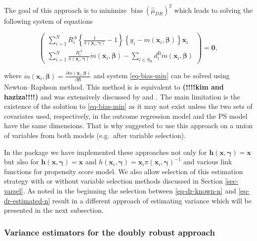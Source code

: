 \documentclass[
]{jss}
\begin{document}
The goal of this approach is to minimize
\(\operatorname{bias}\left(\hat{\mu}_{D R}\right)^2\) which leads to
solving the following system of equations

\begin{equation}
\left(\begin{array}{c}
\sum_{i=1}^N R_i^A\left\{\frac{1}{\pi\left(\boldsymbol{x}_i, \boldsymbol{\gamma}\right)}-1\right\}\left\{y_i-m\left(\boldsymbol{x}_i, \boldsymbol{\beta}\right)\right\} \boldsymbol{x}_i \\
\sum_{i=1}^N \frac{R_i^A}{\pi\left(\boldsymbol{x}_i, \boldsymbol{\gamma}\right)} \dot{m}\left(\boldsymbol{x}_i, \boldsymbol{\beta}\right) -\sum_{i \in S_{\mathrm{B}}} d_i^{\mathrm{B}} \dot{m}\left(\boldsymbol{x}_i, \boldsymbol{\beta}\right)
\end{array}\right) = \boldsymbol{0},
\label{eq-bias-min}
\end{equation}

where
\(\dot{m}\left(\boldsymbol{x}_i, \boldsymbol{\beta}\right)=\frac{\partial m\left(\boldsymbol{x}_i, \boldsymbol{\beta}\right)}{\partial \boldsymbol{\beta}}\)
and system \eqref{eq-bias-min} can be solved using Newton--Raphson
method. This method is is equivalent to
\textbf{(!!!!kim and haziza!!!!)} and was extensively discussed by
\citet{chen2020doubly} and \citet{wu2022statistical}. The main
limitation is the existence of the solution to \eqref{eq-bias-min} as it
may not exist unless the two sets of covariates used, respectively, in
the outcome regression model and the PS model have the same dimensions.
That is why \citet{yang_doubly_2020} suggested to use this approach on a
union of variables from both models (e.g.~after variable selection).

In the  package we have implemented these approaches not
only for
\(\boldsymbol{h}(\boldsymbol{x}, \boldsymbol{\gamma})=\boldsymbol{x}\)
but also for
\(\boldsymbol{h}(\boldsymbol{x}, \boldsymbol{\gamma})=\boldsymbol{x}\)
and
\(h\left(\boldsymbol{x}_i, \boldsymbol{\gamma}\right) = \boldsymbol{x}_i \pi\left(\boldsymbol{x}_i, \boldsymbol{\gamma}\right)^{-1}\)
and various link functions for propensity score model. We also allow
selection of this estimation strategy with or without variable selection
methods discussed in Section \ref{sec-varsel}. As noted in the beginning
the selection between \eqref{eq-dr-known-n} and
\eqref{eq-dr-estimated-n} result in a different approach of estimating
variance which will be presented in the next subsection.

\subsubsection{Variance estimators for the doubly robust
approach}\label{variance-estimators-for-the-doubly-robust-approach}
\end{document}
